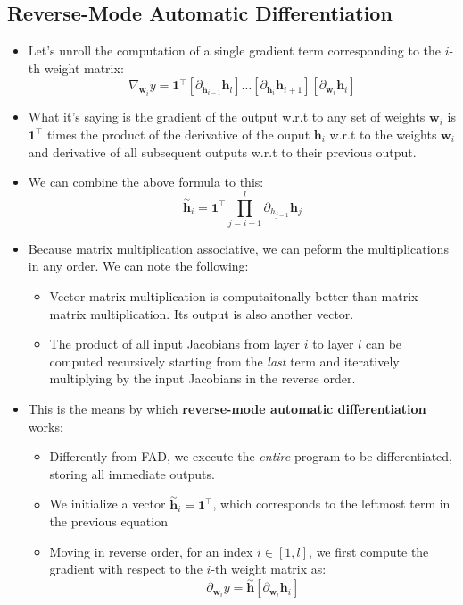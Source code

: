 \documentclass{article}
\newcommand{\tbf}[1]{\textbf{#1}}
\newcommand{\mbf}[1]{\mathbf{#1}}
\begin{document}
\subsection{Reverse-Mode Automatic Differentiation}
\begin{itemize}
    \item Let's unroll the computation of a single gradient term corresponding to the $i$-th weight matrix:
        \[\nabla _{\mbf{w}_i}y = \mbf{1}^\top \left[ \partial_{\mbf{h}_{i-1}} \mbf{h}_l \right] \hdots \left[ \partial_{\mbf{h}_i} \mbf{h}_{i+1}\right] \left[ \partial_{\mbf{w}_i}\mbf{h}_i \right] \]
    \item What it's saying is the gradient of the output w.r.t to any set of weights $\mbf{w}_i$ is $\mbf{1} ^ \top$ times the product of the derivative of the ouput $\mbf{h}_i$ w.r.t to the weights $\mbf{w}_i$ and derivative of all subsequent outputs w.r.t to their previous output. 
    \item We can combine the above formula to this:
    \[\overset{\sim}{\mbf{h}}_i = \mbf{1}^\top \prod ^l _{j = i+1} \partial_{h_{j-1}} \mbf{h}_j\]
    \item Because matrix multiplication associative, we can peform the multiplications in any order. We can note the following:
    \begin{itemize}
        \item Vector-matrix multiplication is computaitonally better than matrix-matrix multiplication. Its output is also another vector.
        \item The product of all input Jacobians from layer $i$ to layer $l$ can be computed recursively starting from the \emph{last} term and iteratively multiplying by the input Jacobians in the reverse order.
    \end{itemize}
    \item This is the means by which \tbf{reverse-mode automatic differentiation} works:
    \begin{itemize}
        \item Differently from FAD, we execute the \emph{entire} program to be differentiated, storing all immediate outputs.
        \item We initialize a vector $\overset{\sim}{\mbf{h}}_i = \mbf{1}^ \top$, which corresponds to the leftmost term in the previous equation
        \item Moving in reverse order, for an index $i \in [1,l]$, we first compute the gradient with respect to the $i$-th weight matrix as:
        \[\partial_{\mbf{w}_i}y = \overset{\sim}{\mbf{h}} \left[ \partial_{\mbf{w}_i} \mbf{h}_i \right]\]

\end{itemize}
\end{itemize}
\end{document}

